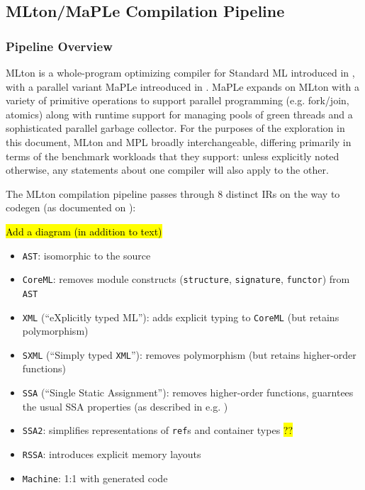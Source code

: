 \documentclass[leqno,11pt]{article}
\begin{document}
\subsection{MLton/MaPLe Compilation Pipeline}

\subsubsection{Pipeline Overview}
MLton is a whole-program optimizing compiler for Standard ML introduced in
\cite{mlton-proj}, with a parallel variant MaPLe intreoduced in
\cite{mpl-orig}. MaPLe expands on MLton with a variety of primitive operations
to support parallel programming (e.g. fork/join, atomics) along with runtime
support for managing pools of green threads and a sophisticated parallel garbage
collector. For the purposes of the exploration in this document, MLton and MPL
broadly interchangeable, differing primarily in terms of the benchmark workloads
that they support: unless explicitly noted otherwise, any statements about one
compiler will also apply to the other.

The MLton compilation pipeline passes through 8 distinct IRs on the way to
codegen (as documented on \cite{mlton-website}):


\hl{Add a diagram (in addition to text)}

\begin{itemize}
\item \texttt{AST}: isomorphic to the source
\item \texttt{CoreML}: removes module constructs (\texttt{structure}, \texttt{signature},
  \texttt{functor}) from \texttt{AST}
\item \texttt{XML} (``eXplicitly typed ML''): adds explicit typing to \texttt{CoreML} (but retains
  polymorphism)
\item \texttt{SXML} (``Simply typed \texttt{XML}''): removes polymorphism (but
  retains higher-order functions)
\item \texttt{SSA} (``Single Static Assignment''): removes higher-order functions,
  guarntees the usual SSA properties (as described in e.g. \cite{ssa-paper})
\item \texttt{SSA2}: simplifies representations of \texttt{ref}s and container types \hl{??}
\item \texttt{RSSA}: introduces explicit memory layouts
\item \texttt{Machine}: 1:1 with generated code
\end{itemize}
\end{document}
